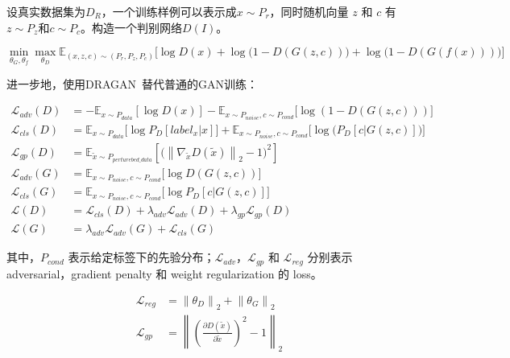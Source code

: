 \documentclass[a4paper,12pt,UTF8]{ctexart}
\newcommand{\norm}[1]{\left\lVert#1\right\rVert}
\begin{document}
设真实数据集为$D_R$，一个训练样例可以表示成$x \sim P_r$，同时随机向量 $z$ 和 $c$ 有$z \sim P_z$和$c \sim P_c$。构造一个判别网络$D(I)$。

\begin{equation}
  \min_{\theta_G,\theta_f} \max_{\theta_D} \mathbb{E}_{(x, z, c) \sim (P_r, P_z, P_c)} \Big[ \log D(x) + \log\big(1 - D(G(z, c))\big) + \log\big(1 - D(G(f(x)))\big)\Big]
\end{equation}

进一步地，使用DRAGAN~\cite{kodali2017convergence}替代普通的GAN训练：

\begin{equation}
\begin{aligned}
  \mathcal{L}_{adv}(D) &= -\mathbb{E}_{x\sim P_{data}}[\log D(x)] - \mathbb{E}_{x\sim P_{noise},c\sim P_{cond}}\big[\log(1-D(G(z,c)))\big] \\
  \mathcal{L}_{cls}(D) &= \mathbb{E}_{x\sim P_{data}}\big[\log P_D[label_x|x]\big] + \mathbb{E}_{x\sim P_{noise},c\sim P_{cond}}\Big[\log\big(P_D[c|G(z,c)]\big)\Big] \\
  \mathcal{L}_{gp}(D) &= \mathbb{E}_{\tilde{x}\sim P_{perturebed\_data}}\left[\big(\norm{\nabla_{\tilde{x}}D(\tilde{x})}_2-1\big)^2\right] \\
  \mathcal{L}_{adv}(G) &= \mathbb{E}_{x\sim P_{noise},c\sim P_{cond}}\big[\log D(G(z,c))\big] \\
  \mathcal{L}_{cls}(G) &= \mathbb{E}_{x\sim P_{noise},c\sim P_{cond}}\big[\log P_D[c|G(z,c)]\big] \\
  \mathcal{L}(D) &= \mathcal{L}_{cls}(D) + \lambda_{adv}\mathcal{L}_{adv}(D)+ \lambda_{gp}\mathcal{L}_{gp}(D) \\
  \mathcal{L}(G) &= \lambda_{adv}\mathcal{L}_{adv}(G) + \mathcal{L}_{cls}(G)
\end{aligned}
\end{equation}



其中，$P_{cond}$ 表示给定标签下的先验分布；$\mathcal{L}_{adv}$，$\mathcal{L}_{gp}$ 和 $\mathcal{L}_{reg}$ 分别表示 adversarial，gradient penalty 和 weight regularization 的 loss。

\begin{equation}
\begin{aligned}
  \mathcal{L}_{reg} &= \norm{\theta_D}_2 + \norm{\theta_G}_2 \\
  \mathcal{L}_{gp} &= \norm{\left(\frac{\partial D(\tilde x)}{\partial \tilde x}\right)^2 - 1 }_2
\end{aligned}
\end{equation}
\end{document}
